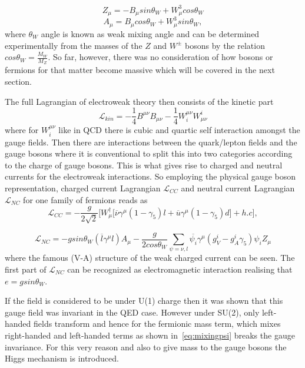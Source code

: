 \begin{equation}
	Z_{\mu}=-B_{\mu}sin\theta_{W}+W^{3}_{\mu}cos\theta_{W}
\end{equation}
\begin{equation}
	A_{\mu}= B_{\mu}cos\theta_{W}+W^{3}_{\mu}sin\theta_{W},
\end{equation}
where $\theta_{W}$ angle is known as weak mixing angle and can be determined experimentally from the masses of the $Z$ and $W^{\pm}$ bosons by the relation
$cos\theta_{W} = \frac{M_{W}}{M_{Z}}$. So far, however, there was no consideration of how bosons or fermions for that matter become massive which will be covered in the next section.

The full Lagrangian of electroweak theory then consists of the kinetic part
\begin{equation}
\mathcal{L}_{kin}=  -\frac{1}{4} B^{\mu\nu}B_{\mu\nu} -\frac{1}{4} W_{i}^{\mu\nu}W^{i}_{\mu\nu}
\end{equation}
where for $W_{i}^{\mu\nu}$ like in \gls{QCD} there is cubic and quartic self interaction amongst the gauge fields. Then there are interactions between the quark/lepton fields and the gauge bosons where it is conventional to split this into two categories according to the charge of gauge bosons.
This is what gives rise to charged and neutral currents for the electroweak interactions. So employing the physical gauge boson representation, charged current Lagrangian $\mathcal{L}_{CC}$ and neutral current Lagrangian $\mathcal{L}_{NC}$ for one family of fermions reads as
\begin{equation}
	\mathcal{L}_{CC}= - \frac{g}{2\sqrt{2}}\Big[W_{\mu}^{\dagger}\big[\overline{\nu}\gamma^{\mu}(1-\gamma_{5})l + \overline{u}\gamma^{\mu}(1-\gamma_{5})d\big] + h.c\Big], 
\label{eq:LC}
\end{equation}

\begin{equation}
	\mathcal{L}_{NC}= - g sin\theta_{W}(\overline{l}\gamma^{\mu}l)A_{\mu} - \frac{g}{2cos\theta_{W}}\sum_{\psi=\nu,l} \overline{\psi_{i}}\gamma^{\mu}(g^{i}_{V} - g^{i}_{A}\gamma_{5})\psi_{i}Z_{\mu}
\label{eq:NC}
\end{equation}
where the famous (V-A) structure of the weak charged current can be seen. The first part of $\mathcal{L}_{NC}$ can be recognized as electromagnetic interaction realising that $e=gsin\theta_{W}$. 

If the field is considered to be under U(1) charge then it was shown that this gauge field was invariant in the QED case. However under SU(2), only left-handed fields transform and hence for the fermionic mass term, which mixes right-handed and left-handed terms as shown in~\autoref{eq:mixingpsi} breaks the gauge invariance.
For this very reason and also to give mass to the gauge bosons the Higgs mechanism is introduced.

